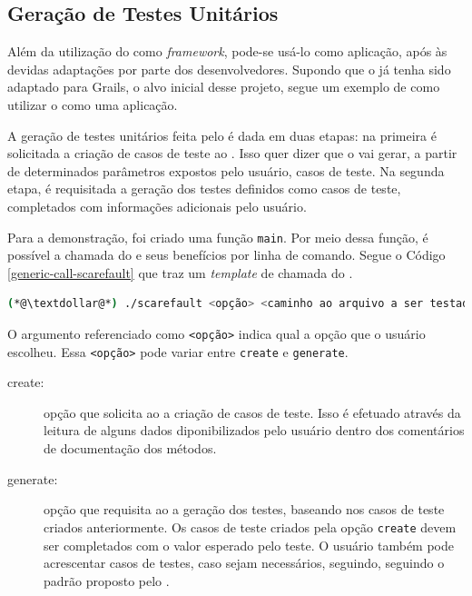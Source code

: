 \subsection{Geração de Testes Unitários}
Além da utilização do \scarefault como \textit{framework}, pode-se usá-lo como
aplicação, após às devidas adaptações por parte dos desenvolvedores. Supondo
que o \scarefault já tenha sido adaptado para  \textsf{Grails}, o alvo inicial
desse projeto, segue um exemplo de como utilizar o \scarefault como uma
aplicação.

A geração de testes unitários feita pelo \scarefault é dada em duas etapas:
na primeira é solicitada a criação de casos de teste ao \Scarefault. Isso
quer dizer que o \scarefault vai gerar, a partir de determinados parâmetros
expostos pelo usuário, casos de teste. Na segunda etapa, é requisitada a
geração dos testes definidos como casos de teste, completados com informações
adicionais pelo usuário.

Para a demonstração, foi criado uma função \lstinline|main|. Por meio dessa
função, é possível a chamada do \scarefault e seus benefícios por linha
de comando. Segue o Código \ref{generic-call-scarefault} que traz um
\textit{template} de chamada do \Scarefault.

\begin{lstlisting}[language=bash, label=generic-call-scarefault, caption=Template para chamada do \scarefault pela linha de comando]
(*@\textdollar@*) ./scarefault <opção> <caminho ao arquivo a ser testado> [categoria do padrão MVC]
\end{lstlisting}

O argumento referenciado como \lstinline|<opção>| indica qual a opção que o
usuário escolheu. Essa \lstinline|<opção>| pode variar entre \lstinline|create|
e \lstinline|generate|.
\begin{description}
\item[\textsf{create}:] opção que solicita ao \scarefault a criação de
casos de teste. Isso é efetuado através da leitura de alguns dados
diponibilizados pelo usuário dentro dos comentários de documentação dos
métodos.
\item[\textsf{generate}:] opção que requisita ao \scarefault a geração
dos testes, baseando nos casos de teste criados anteriormente. Os casos de
teste criados pela opção \lstinline|create| devem ser completados com o
valor esperado pelo teste. O usuário também pode acrescentar casos de testes, caso sejam necessários, seguindo, seguindo o padrão proposto pelo \Scarefault.
\end{description}

